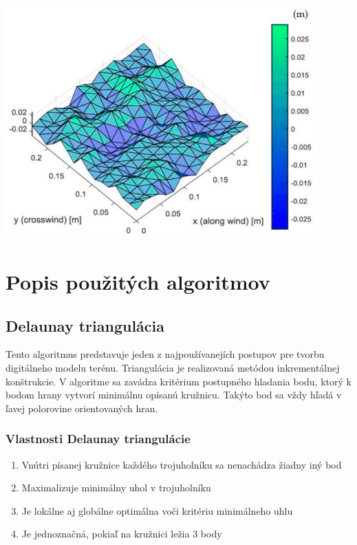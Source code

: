 \documentclass[12pt]{article}
\begin{document}
\begin{center}
   \includegraphics[width=12cm]{./img/Delaunay_DTM.png}
\end{center}

\clearpage 
\section {Popis použitých algoritmov}
\subsection {Delaunay triangulácia}
Tento algoritmus predstavuje jeden z najpoužívanejích postupov pre tvorbu digitálneho modelu terénu. Triangulácia je realizovaná metódou inkrementálnej konštrukcie. V algoritme sa zavádza kritérium postupného hladania bodu, ktorý k bodom hrany vytvorí minimálnu opísanú kružnicu. Takýto bod sa vždy hľadá v ľavej polorovine orientovaných hran. 

\subsubsection {Vlastnosti Delaunay triangulácie}
\begin{enumerate}
\item Vnútri písanej kružnice každého trojuholníku sa nenachádza žiadny iný bod
\item Maximalizuje minimálny uhol v trojuholníku
\item Je lokálne aj globálne optimálna voči kritériu minimálneho uhlu
\item Je jednoznačná, pokiaľ na kružnici ležia 3 body
\end{enumerate}
\end{document}
